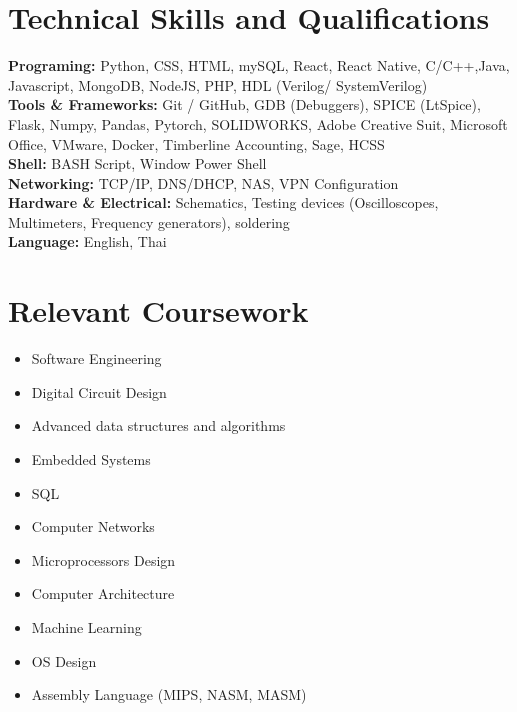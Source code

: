 \documentclass[letterpaper,11pt]{article}
\newcommand{\resumeSubHeadingListStart}{\begin{itemize}[leftmargin=0.0in, label={}]}
\newcommand{\resumeSubHeadingListEnd}{\end{itemize}}
\begin{document}
\section{Technical Skills and Qualifications }
\begin{itemize}[left=0.15in, label={}]
    \small{
    \item \textbf{Programing:} Python, CSS, HTML, mySQL, React, React Native, C/C++,Java, Javascript, MongoDB, NodeJS, PHP, 
    HDL (Verilog/ SystemVerilog) \\
    \textbf{Tools \& Frameworks:} Git / GitHub, GDB (Debuggers), SPICE (LtSpice), Flask, Numpy, Pandas, Pytorch, SOLIDWORKS, Adobe Creative Suit, Microsoft Office, VMware, Docker, Timberline Accounting, Sage, HCSS \\
    \textbf{Shell:} BASH Script, Window Power Shell \\
    \textbf{Networking:} TCP/IP, DNS/DHCP, NAS, VPN Configuration \\
    \textbf{Hardware \& Electrical:} Schematics, Testing devices (Oscilloscopes, Multimeters, Frequency generators), soldering \\
    \textbf{Language:} English, Thai \\
    }
\end{itemize}
\vspace{-15pt}

\section{Relevant Coursework}
        \begin{multicols}{4}
            \begin{itemize}[itemsep=-1pt, parsep=3pt]
                \item \small Software Engineering
                \item \small Digital Circuit Design 
                \item \small Advanced data structures and algorithms
                \item \small Embedded Systems
                \item \small SQL 
                \item \small Computer Networks
                \item \small Microprocessors Design
                \item \small Computer Architecture
                \item \small Machine Learning
                \item \small OS Design
                \item \small Assembly Language (MIPS, NASM, MASM)
            \end{itemize}
        \end{multicols}
        \vspace*{1.5\multicolsep}
\vspace{8pt}
\end{document}
